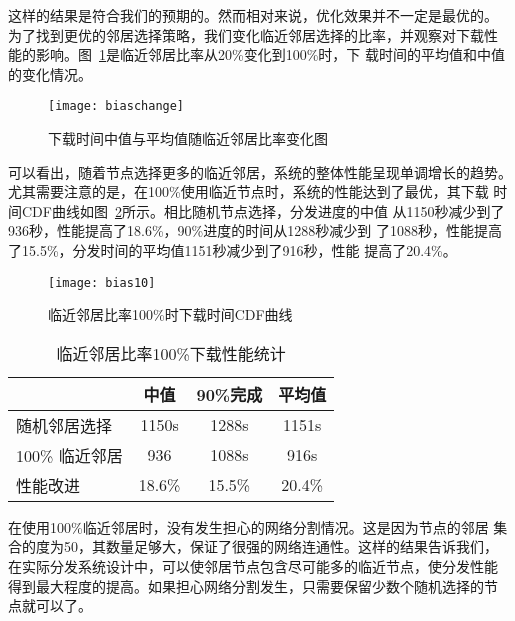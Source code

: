 这样的结果是符合我们的预期的。然而相对来说，优化效果并不一定是最优的。
为了找到更优的邻居选择策略，我们变化临近邻居选择的比率，并观察对下载性
能的影响。图~\ref{fig:biaschange}是临近邻居比率从20\%变化到100\%时，下
载时间的平均值和中值的变化情况。

\begin{figure}
  \centering
  \begin{minipage}{0.6\linewidth}
    \centering
    \texttt{[image: biaschange]}
    \caption{下载时间中值与平均值随临近邻居比率变化图}
    \label{fig:biaschange}
  \end{minipage}
\end{figure}

可以看出，随着节点选择更多的临近邻居，系统的整体性能呈现单调增长的趋势。
尤其需要注意的是，在100\%使用临近节点时，系统的性能达到了最优，其下载
时间CDF曲线如图~\ref{fig:bias10}所示。相比随机节点选择，分发进度的中值
从1150秒减少到了936秒，性能提高了18.6\%，90\%进度的时间从1288秒减少到
了1088秒，性能提高了15.5\%，分发时间的平均值1151秒减少到了916秒，性能
提高了20.4\%。

\begin{figure}
  \centering
  \begin{minipage}{0.6\linewidth}
    \centering
    \texttt{[image: bias10]}
    \caption{临近邻居比率100\%时下载时间CDF曲线}
    \label{fig:bias10}
  \end{minipage}
\end{figure}

\begin{table}
\centering
\begin{minipage}{0.8\linewidth}
\centering
\caption{临近邻居比率100\%下载性能统计}
\label{tbl:bias10}
\begin{tabular}{lccc}

\toprule[1.5pt]
              & 中值 & 90\%完成 & 平均值\\
\midrule[1pt]
随机邻居选择  & 1150s & 1288s & 1151s\\
100\% 临近邻居 & 936 & 1088s & 916s\\
性能改进      & 18.6\% & 15.5\% & 20.4\%\\
\bottomrule[1.5pt]
\end{tabular}
\end{minipage}
\end{table}

在使用100\%临近邻居时，没有发生担心的网络分割情况。这是因为节点的邻居
集合的度为50，其数量足够大，保证了很强的网络连通性。这样的结果告诉我们，
在实际分发系统设计中，可以使邻居节点包含尽可能多的临近节点，使分发性能
得到最大程度的提高。如果担心网络分割发生，只需要保留少数个随机选择的节
点就可以了。

